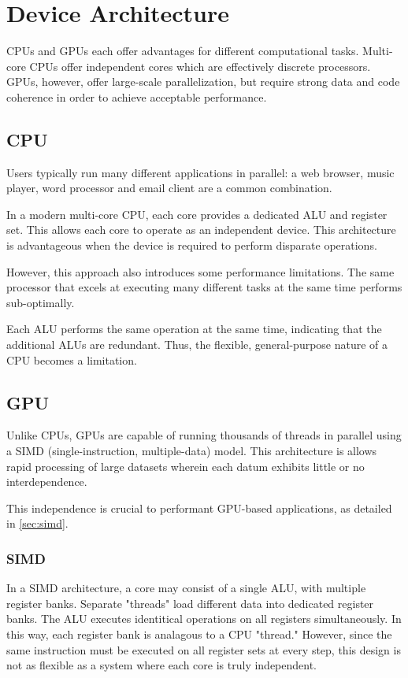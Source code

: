 \chapter{Device Architecture} \label{ch:device architecture}

CPUs and GPUs each offer advantages for different computational tasks. Multi-core CPUs offer independent cores which are effectively discrete processors. GPUs, however, offer large-scale parallelization, but require strong data and code coherence in order to achieve acceptable performance.


\section{CPU}

Users typically run many different applications in parallel: a web browser, music player, word processor and email client are a common combination.

In a modern multi-core CPU, each core provides a dedicated ALU and register set. This allows each core to operate as an independent device. This architecture is advantageous when the device is required to perform disparate operations.

However, this approach also introduces some performance limitations. The same processor that excels at executing many different tasks at the same time performs sub-optimally. 

Each ALU performs the same operation at the same time, indicating that the additional ALUs are redundant. Thus, the flexible, general-purpose nature of a CPU becomes a limitation.

\section{GPU}

Unlike CPUs, GPUs are capable of running thousands of threads in parallel using a SIMD (single-instruction, multiple-data) model. This architecture is allows rapid processing of large datasets wherein each datum exhibits little or no interdependence. 

This independence is crucial to performant GPU-based applications, as detailed in \autoref{sec:simd}.

\subsection{SIMD}\label{sec:simd}

In a SIMD\cite{Massingill:2007:SAP:1772070.1772078} architecture, a core may consist of a single ALU, with multiple register banks. Separate "threads" load different data into dedicated register banks. The ALU executes identitical operations on all registers simultaneously. In this way, each register bank is analagous to a CPU "thread." However, since the same instruction must be executed on all register sets at every step, this design is not as flexible as a system where each core is truly independent.

